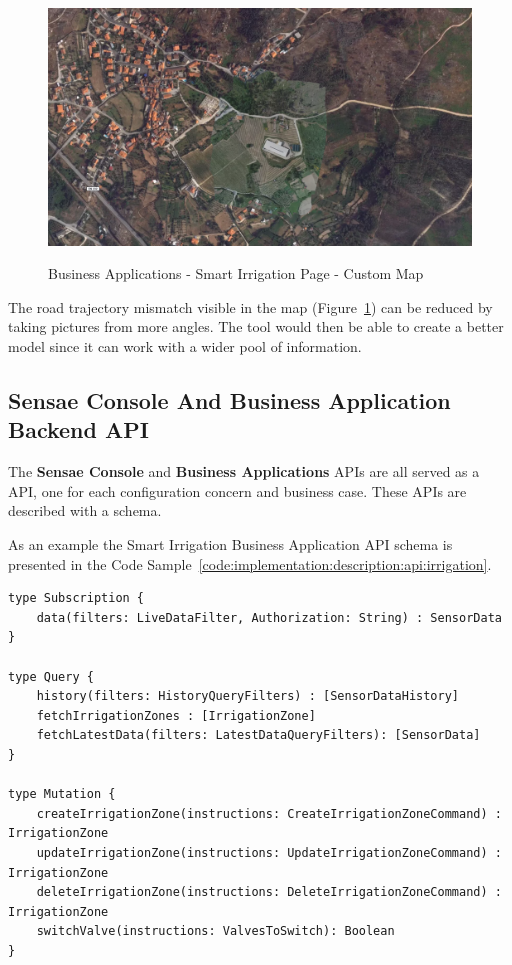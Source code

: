 \begin{figure}[H]
    \centering
    \resizebox{\columnwidth}{!}
    {
       \includegraphics{assets/figures/maps/custom-map.png}
    }
    \caption[Business Applications - Smart Irrigation Page - Custom Map]{Business Applications - Smart Irrigation Page - Custom Map}
    \label{fig:implementation:description:maps:irrig}
\end{figure}

The road trajectory mismatch visible in the map (Figure~\ref{fig:implementation:description:maps:irrig}) can be reduced by taking pictures from more angles. The  tool would then be able to create a better model since it can work with a wider pool of information.

\subsection{Sensae Console And Business Application Backend API}
\label{subsec:implementation:description:api}

The \textbf{Sensae Console} and \textbf{Business Applications} \gls{API}s are all served as a  \gls{API}, one for each configuration concern and business case. These \gls{API}s are described with a  schema.

As an example the Smart Irrigation Business Application \gls{API} schema is presented in the Code Sample~\ref{code:implementation:description:api:irrigation}.

\begin{lstlisting}[caption=Smart Irrigation API Schema, label={code:implementation:description:api:irrigation}]
type Subscription {
    data(filters: LiveDataFilter, Authorization: String) : SensorData
}

type Query {
    history(filters: HistoryQueryFilters) : [SensorDataHistory]
    fetchIrrigationZones : [IrrigationZone]
    fetchLatestData(filters: LatestDataQueryFilters): [SensorData]
}

type Mutation {
    createIrrigationZone(instructions: CreateIrrigationZoneCommand) : IrrigationZone
    updateIrrigationZone(instructions: UpdateIrrigationZoneCommand) : IrrigationZone
    deleteIrrigationZone(instructions: DeleteIrrigationZoneCommand) : IrrigationZone
    switchValve(instructions: ValvesToSwitch): Boolean
}
\end{lstlisting}

